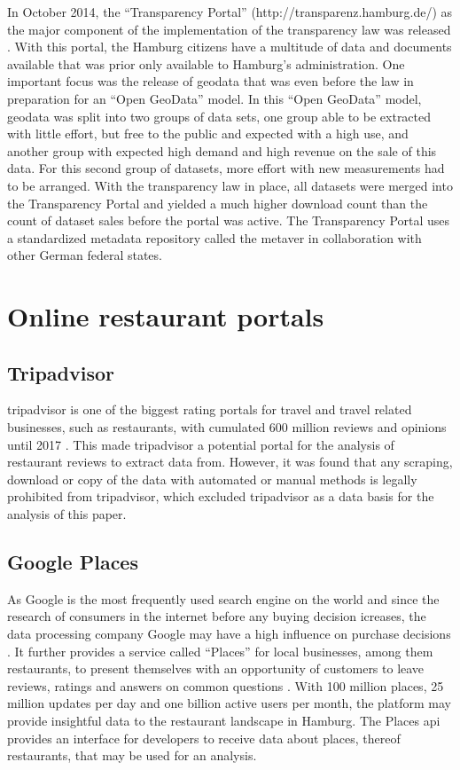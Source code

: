 \documentclass[a4paper, 11pt, oneside]{Thesis}  %
\begin{document}
In October 2014, the ``Transparency Portal'' (http://transparenz.hamburg.de/) as the major component of the implementation of the transparency law was released \cite{Murjahn.2016}. With this portal, the Hamburg citizens have a multitude of data and documents available that was prior only available to Hamburg's administration. One important focus was the release of geodata that was even before the law in preparation for an ``Open GeoData'' model. In this ``Open GeoData'' model, geodata was split into two groups of data sets, one group able to be extracted with little effort, but free to the public and expected with a high use, and another group with expected high demand and high revenue on the sale of this data. For this second group of datasets, more effort with new measurements had to be arranged. With the transparency law in place, all datasets were merged into the Transparency Portal and yielded a much higher download count than the count of dataset sales before the portal was active. The Transparency Portal uses a standardized metadata repository called the \ac{metaver} in collaboration with other German federal states.

\section{Online restaurant portals}

\subsection{Tripadvisor}

tripadvisor is one of the biggest rating portals for travel and travel related businesses, such as restaurants, with cumulated 600 million reviews and opinions until 2017 \cite{StephenKaufer.27.04.2018}. This made tripadvisor a potential portal for the analysis of restaurant reviews to extract data from. However, it was found that any scraping, download or copy of the data with automated or manual methods is legally prohibited from tripadvisor, which excluded tripadvisor as a data basis for the analysis of this paper.

\subsection{Google Places}

As Google is the most frequently used search engine on the world and since the research of consumers in the internet before any buying decision icreases, the data processing company Google may have a high influence on purchase decisions \cite{Zhao.2018} \cite{Shim.2001}. It further provides a service called ``Places'' for local businesses, among them restaurants, to present themselves with an opportunity of customers to leave reviews, ratings and answers on common questions \cite{GooglePlaces}. With 100 million places, 25 million updates per day and one billion active users per month, the platform may provide insightful data to the restaurant landscape in Hamburg. The Places \ac{api} provides an interface for developers to receive data about places, thereof restaurants, that may be used for an analysis. 
\end{document}
